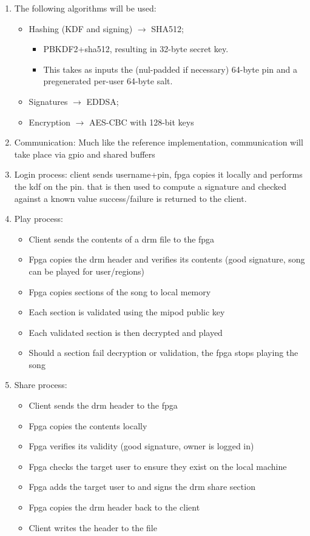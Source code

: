 \documentclass[11pt]{extarticle}
\begin{document}
\begin{enumerate}
    \item The following algorithms will be used:
    \begin{itemize}
        \item Hashing (KDF and signing) $\rightarrow$ SHA512;
            \begin{itemize}
                \item PBKDF2+sha512, resulting in 32-byte secret key.
                \item This takes as inputs the (nul-padded if necessary) 64-byte pin and a pregenerated per-user 64-byte salt.
            \end{itemize}
        \item Signatures $\rightarrow$ EDDSA;
        \item Encryption $\rightarrow$ AES-CBC with 128-bit keys
    \end{itemize}

    \item Communication:  Much like the reference implementation, communication will take place via gpio and shared buffers

    \item Login process: client sends username+pin, fpga copies it locally and performs the kdf on the pin.
    that is then used to compute a signature and checked against a known value success/failure is returned to the client.

    \item Play process:
    \begin{itemize}
        \item Client sends the contents of a drm file to the fpga
        \item Fpga copies the drm header and verifies its contents (good signature, song can be played for user/regions)
        \item Fpga copies sections of the song to local memory
        \item Each section is validated using the mipod public key
        \item Each validated section is then decrypted and played
        \item Should a section fail decryption or validation, the fpga stops playing the song
    \end{itemize}

    \item Share process:
    \begin{itemize}
        \item Client sends the drm header to the fpga
        \item Fpga copies the contents locally
        \item Fpga verifies its validity (good signature, owner is logged in)
        \item Fpga checks the target user to ensure they exist on the local machine
        \item Fpga adds the target user to and signs the drm share section
        \item Fpga copies the drm header back to the client
        \item Client writes the header to the file
    \end{itemize}


\end{enumerate}
\end{document}
